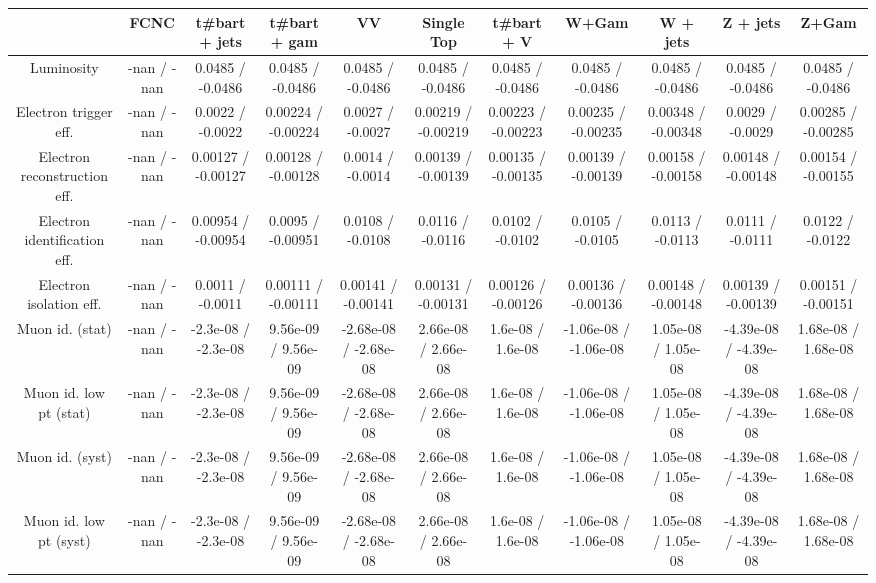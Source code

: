 \begin{table}[htbp]
\begin{center}
\footnotesize
\begin{tabular}{|c|c|c|c|c|c|c|c|c|c|c|}
\hline 
      & FCNC      & t#bar{t} + jets      & t#bar{t} +  gam      & VV      & Single Top      & t#bar{t} + V      & W+Gam      & W + jets      & Z + jets      & Z+Gam \\ 
\hline 
  Luminosity & -nan / -nan & 0.0485 / -0.0486 & 0.0485 / -0.0486 & 0.0485 / -0.0486 & 0.0485 / -0.0486 & 0.0485 / -0.0486 & 0.0485 / -0.0486 & 0.0485 / -0.0486 & 0.0485 / -0.0486 & 0.0485 / -0.0486 \\ 
  Electron trigger eff. & -nan / -nan & 0.0022 / -0.0022 & 0.00224 / -0.00224 & 0.0027 / -0.0027 & 0.00219 / -0.00219 & 0.00223 / -0.00223 & 0.00235 / -0.00235 & 0.00348 / -0.00348 & 0.0029 / -0.0029 & 0.00285 / -0.00285 \\ 
  Electron reconstruction eff. & -nan / -nan & 0.00127 / -0.00127 & 0.00128 / -0.00128 & 0.0014 / -0.0014 & 0.00139 / -0.00139 & 0.00135 / -0.00135 & 0.00139 / -0.00139 & 0.00158 / -0.00158 & 0.00148 / -0.00148 & 0.00154 / -0.00155 \\ 
  Electron identification eff. & -nan / -nan & 0.00954 / -0.00954 & 0.0095 / -0.00951 & 0.0108 / -0.0108 & 0.0116 / -0.0116 & 0.0102 / -0.0102 & 0.0105 / -0.0105 & 0.0113 / -0.0113 & 0.0111 / -0.0111 & 0.0122 / -0.0122 \\ 
  Electron isolation eff. & -nan / -nan & 0.0011 / -0.0011 & 0.00111 / -0.00111 & 0.00141 / -0.00141 & 0.00131 / -0.00131 & 0.00126 / -0.00126 & 0.00136 / -0.00136 & 0.00148 / -0.00148 & 0.00139 / -0.00139 & 0.00151 / -0.00151 \\ 
  Muon id. (stat) & -nan / -nan & -2.3e-08 / -2.3e-08 & 9.56e-09 / 9.56e-09 & -2.68e-08 / -2.68e-08 & 2.66e-08 / 2.66e-08 & 1.6e-08 / 1.6e-08 & -1.06e-08 / -1.06e-08 & 1.05e-08 / 1.05e-08 & -4.39e-08 / -4.39e-08 & 1.68e-08 / 1.68e-08 \\ 
  Muon id. low pt (stat) & -nan / -nan & -2.3e-08 / -2.3e-08 & 9.56e-09 / 9.56e-09 & -2.68e-08 / -2.68e-08 & 2.66e-08 / 2.66e-08 & 1.6e-08 / 1.6e-08 & -1.06e-08 / -1.06e-08 & 1.05e-08 / 1.05e-08 & -4.39e-08 / -4.39e-08 & 1.68e-08 / 1.68e-08 \\ 
  Muon id. (syst) & -nan / -nan & -2.3e-08 / -2.3e-08 & 9.56e-09 / 9.56e-09 & -2.68e-08 / -2.68e-08 & 2.66e-08 / 2.66e-08 & 1.6e-08 / 1.6e-08 & -1.06e-08 / -1.06e-08 & 1.05e-08 / 1.05e-08 & -4.39e-08 / -4.39e-08 & 1.68e-08 / 1.68e-08 \\ 
  Muon id. low pt (syst) & -nan / -nan & -2.3e-08 / -2.3e-08 & 9.56e-09 / 9.56e-09 & -2.68e-08 / -2.68e-08 & 2.66e-08 / 2.66e-08 & 1.6e-08 / 1.6e-08 & -1.06e-08 / -1.06e-08 & 1.05e-08 / 1.05e-08 & -4.39e-08 / -4.39e-08 & 1.68e-08 / 1.68e-08 \\ 

\end{tabular}
\end{center}
\end{table}
